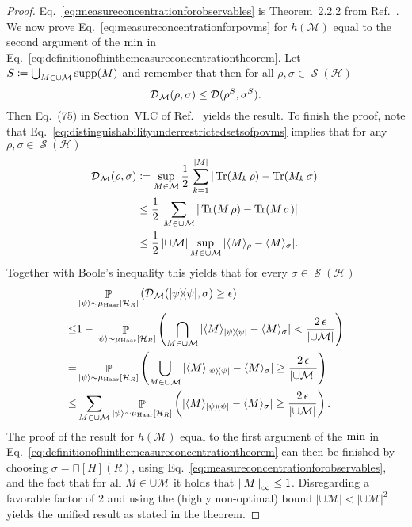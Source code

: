 \documentclass[a4paper,12pt,listof=totoc,index=totoc,bibliography=totoc,headsepline=false,headings=normal,BCOR16.153846mm,DIV12,headinclude,twoside,cleardoublepage=empty,numbers=noenddot,final]{scrreprt}
\theoremstyle{mystyle}
\numberwithin{equation}{section}
\numberwithin{figure}{section}
\numberwithin{lemma}{section}
\numberwithin{theorem}{section}
\numberwithin{corollary}{section}
\numberwithin{definition}{section}
\numberwithin{conjecture}{section}
\numberwithin{observation}{section}
\newcommand{\+}{\mkern2mu}
\newcommand{\coloneqq}{\mathrel{\vcentcolon\mkern-1.2mu=}} %
\newcommand{\union}{\cup}
\newcommand{\texteqref}[1]{Eq.~\eqref{#1}}
\renewcommand{\min}{\mathchoice{\operatorname*{min}}{\operatorname*{min}}{\mathrm{min}}{\mathrm{min}}}
\renewcommand{\H}{H}
\newcommand{\rhomc}{{\sqcap}}
\newcommand{\muhaar}{\mu_{\mathrm{Haar}}}
\newcommand{\bra}[1]{\langle #1|}
\newcommand{\ket}[1]{|#1\rangle}
\newcommand{\ketbra}[2]{\ket{#1}\!\bra{#2}}
\newcommand{\ex}[2]{\langle #1 \rangle_{#2}}
\newcommand{\norm}[2][]{
  \ifthenelse{\equal{#1}{}}
    {\left\| {#2} \right\|}
    {\ifthenelse{\equal{#1}{uinv}}
      {\left\vert\kern-0.25ex\left\vert\kern-0.25ex\left\vert {#2} \right\vert\kern-0.25ex\right\vert\kern-0.25ex\right\vert}
      {\left\| {#2} \right\|_{#1}}
    }
}
\newcommand{\tracedistance}[3][]{
  \ifthenelse{\equal{#2}{}}
  {\ifthenelse{\equal{#3}{}}
    {\mathcal{D}_{#1}}{}
  }{
    \ifthenelse{\equal{#1}{}}
    {\operatorname{\mathcal{D}}(#2,#3)}
    {\operatorname{\mathcal{D}}_{#1}(#2,#3)}
  }
}
\DeclareMathOperator*{\probability}{\mathbb{P}}
\DeclareMathOperator{\1}{\mathds{1}}
\newcommand{\POVMs}{\mathcal{M}}
\DeclareMathOperator{\Qst}{\mathcal{S}}
\DeclareMathOperator{\Tr}{Tr}
\DeclareMathOperator{\supp}{supp}
\newcommand{\mc}[1]{\mathcal{#1}}
\newcommand{\mcH}{\mc{H}}
\begin{document}
\begin{proof}
  \texteqref{eq:measureconcentrationforobservables} is Theorem~2.2.2 from Ref.~\cite{Gogolin10-masterthesis}.
  We now prove \texteqref{eq:measureconcentrationforpovms} for $h(\POVMs)$ equal to the second argument of the $\min$ in \texteqref{eq:definitionofhinthemeasureconcentrationtheorem}.
  Let $S \coloneqq \bigcup_{M \in \union \POVMs} \supp(M)$ and remember that then for all $\rho,\sigma \in \Qst(\mcH)$
  \begin{equation}
    \tracedistance[\POVMs]\rho\sigma \leq \tracedistance{\rho^S}{\sigma^S} . 
  \end{equation}  
  Then Eq.~(75) in Section~VI.C of Ref.~\cite{Popescu05} yields the result.
  To finish the proof, note that \texteqref{eq:distinguishabilityunderrestrictedsetsofpovms} implies that for any $\rho,\sigma \in \Qst(\mcH)$
  \begin{align} \label{eq:distinguishabilityupperboundforproofofmeasureconcentrationtheorem}
    \tracedistance[\POVMs]\rho\sigma &\coloneqq \sup_{M \in \POVMs} \frac{1}{2}\,\sum_{k=1}^{|M|} |\Tr(M_k\,\rho) - \Tr(M_k\,\sigma)| \\
    &\leq \frac{1}{2}\,\sum_{M \in \union\POVMs } |\Tr(M\,\rho) - \Tr(M\,\sigma)| \\
    &\leq \frac{1}{2}\,|{\union\POVMs}| \sup_{M \in \union\POVMs } |\ex M \rho - \ex M \sigma | .
  \end{align}
  Together with Boole's inequality this yields that for every $\sigma \in \Qst(\mcH)$
  \begin{align}
    &\probability_{\ket\psi\sim\muhaar[\mcH_R]}\left(\tracedistance[\POVMs]{\ketbra\psi\psi}\sigma \geq \epsilon\right) \nonumber\\
    \leq &1 - \probability_{\ket\psi\sim\muhaar[\mcH_R]}\left(\bigcap_{M \in \union\POVMs} |\ex M {\ketbra\psi\psi} - \ex M \sigma |< \frac{2\,\epsilon}{|{\union\POVMs}|} \right) \\
    = &\probability_{\ket\psi\sim\muhaar[\mcH_R]}\left(\bigcup_{M \in \union\POVMs} |\ex M {\ketbra\psi\psi} - \ex M \sigma| \geq \frac{2\,\epsilon}{|{\union\POVMs}|} \right) \\
    \leq &\sum_{M \in \union\POVMs} \probability_{\ket\psi\sim\muhaar[\mcH_R]}\left( |\ex M {\ketbra\psi\psi} - \ex M \sigma| \geq \frac{2\,\epsilon}{|{\union\POVMs}|} \right) .
  \end{align}
  The proof of the result for $h(\POVMs)$ equal to the first argument of the $\min$ in \texteqref{eq:definitionofhinthemeasureconcentrationtheorem} can then be finished by choosing $\sigma = \rhomc[\H](R)$, using \texteqref{eq:measureconcentrationforobservables}, and the fact that for all $M \in \union \POVMs$ it holds that $\norm[\infty]{M} \leq 1$.
  Disregarding a favorable factor of $2$ and using the (highly non-optimal) bound $|{\union\POVMs}| < |{\union\POVMs}|^2$ yields the unified result as stated in the theorem.
\end{proof}
\end{document}
